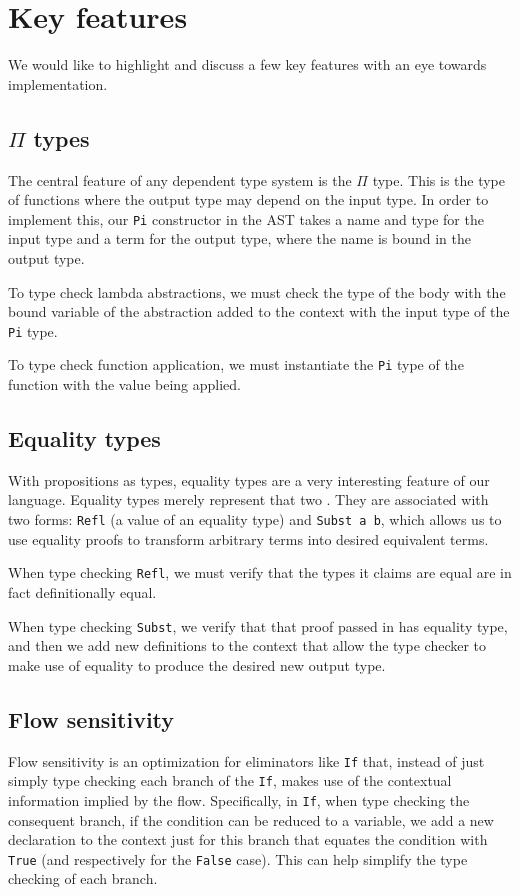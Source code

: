 



\section{Key features}
We would like to highlight and discuss a few key features with an eye towards
implementation.

\subsection{$\Pi$ types}
The central feature of any dependent type system is the $\Pi$ type. This is the
type of functions where the output type may depend on the input type. In order
to implement this, our \texttt{Pi} constructor in the AST takes a name and type for the
input type and a term for the output type, where the name is bound in the
output type.

To type check lambda abstractions, we must check the type of the body with the
bound variable of the abstraction added to the context with the input type of
the \texttt{Pi} type.

To type check function application, we must instantiate the \texttt{Pi} type of
the function with the value being applied.

\subsection{Equality types}\label{equal}
With propositions as types, equality types are a very interesting feature of
our language. Equality types merely represent that two . They are associated
with two forms: \texttt{Refl} (a value of an equality type) and \texttt{Subst a
b}, which allows us to use equality proofs to transform arbitrary terms into
desired equivalent terms.

When type checking \texttt{Refl}, we must verify that the types it claims are
equal are in fact definitionally equal.

When type checking \texttt{Subst}, we verify that that proof passed in has
equality type, and then we add new definitions to the context that allow the
type checker to make use of equality to produce the desired new output type.

\subsection{Flow sensitivity}\label{flow}
Flow sensitivity is an optimization for eliminators like \texttt{If} that,
instead of just simply type checking each branch of the \texttt{If}, makes use
of the contextual information implied by the flow. Specifically, in \texttt{If}, when type checking the
consequent branch, if the condition can be reduced to a variable, we add a new
declaration to the context just for this branch that equates the condition with
\texttt{True} (and respectively for the \texttt{False} case). This can help
simplify the type checking of each branch.

